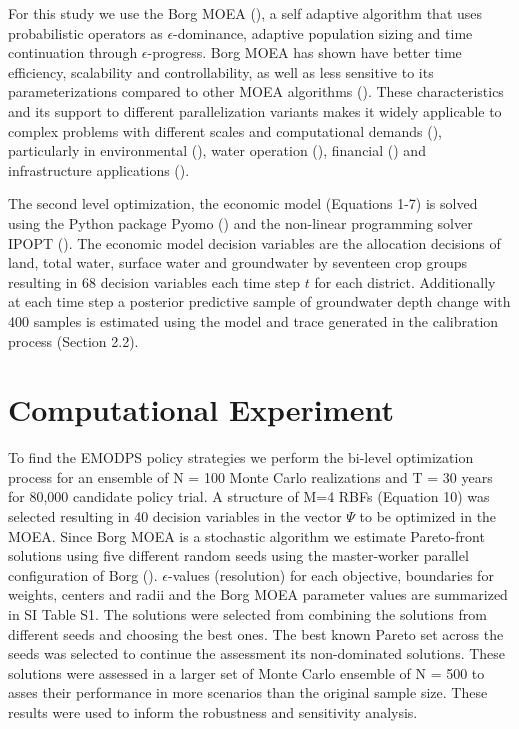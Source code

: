 \documentclass[11pt,a4paper]{article}
\begin{document}
For this study we use the Borg MOEA (\cite{hadka_borg_2013}), a self adaptive algorithm that uses probabilistic operators as $\epsilon$-dominance, adaptive population sizing and time continuation through $\epsilon$-progress. Borg MOEA has shown have better time efficiency, scalability and controllability, as well as less sensitive to its parameterizations compared to other MOEA algorithms (\cite{reed_evolutionary_2013}).  These characteristics and its support to different parallelization variants makes it widely applicable to complex problems with different scales and computational demands (\cite{hadka_large-scale_2015}), particularly in environmental (\cite{kravits_multi-objective_2021,ward_confronting_2015,meysami_evaluating_2020}), water operation (\cite{zatarain_salazar_balancing_2017,yan_many-objective_2017,smith_many-objective_2016,zeff_cooperative_2016, gupta_can_2020}), financial (\cite{hamilton_stream_2022}) and infrastructure applications (\cite{eckart_multiobjective_2018,bakhshipour_toward_2021,gold_power_2022}).   

The second level optimization, the economic model (Equations 1-7) is solved using the Python package Pyomo (\cite{hart_pyomo_2011}) and the non-linear programming solver IPOPT (\cite{wachter_implementation_2006}). The economic model decision variables are the allocation decisions of land, total water, surface water and groundwater by seventeen crop groups resulting in 68 decision variables each time step $t$ for each district. Additionally at each time step a posterior predictive sample of groundwater depth change with 400  samples is estimated using the model and trace generated in the calibration process (Section 2.2).

\section{Computational Experiment}

To find the EMODPS policy strategies we perform the bi-level optimization process for an ensemble of N = 100 Monte Carlo realizations and T = 30 years for 80,000 candidate policy trial. A structure of M=4 RBFs (Equation 10) was selected resulting in 40 decision variables in the vector $\Psi$ to be optimized in the MOEA. Since Borg MOEA is a stochastic algorithm we estimate Pareto-front solutions using five different random seeds using the master-worker parallel configuration of Borg (\cite{hadka_large-scale_2015}). $\epsilon$-values (resolution) for each objective, boundaries for weights, centers and radii and the Borg MOEA parameter values are summarized in SI Table S1. The solutions were selected from combining the solutions from different seeds and choosing the best ones. The best known Pareto set across the seeds was selected to continue the assessment its non-dominated solutions. These solutions were assessed in a larger set of Monte Carlo ensemble of N = 500 to asses their performance in more scenarios than the original sample size. These results were used to inform the robustness and sensitivity analysis.
\end{document}
